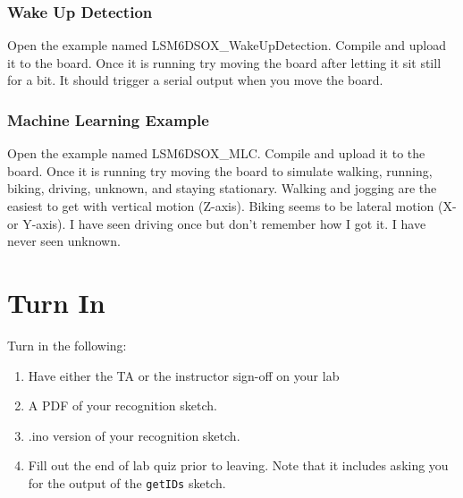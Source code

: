 \subsubsection{Wake Up Detection}
Open the example named LSM6DSOX\_WakeUpDetection. Compile and upload it to the board. Once it is 
running try moving the board after letting it sit still for a bit. It should trigger a serial 
output when you move the board.

\subsubsection{Machine Learning Example}
Open the example named LSM6DSOX\_MLC. Compile and upload it to the board. Once it is 
running try moving the board to simulate walking, running, biking, driving, unknown, and 
staying stationary. Walking and jogging are the easiest to get with vertical motion (Z-axis). 
Biking seems to be lateral motion (X- or Y-axis). I have seen driving once but don't remember 
how I got it. I have never seen unknown.



\section{Turn In}
Turn in the following:
\begin{enumerate}
    \item Have either the TA or the instructor sign-off on your lab
    \item A PDF of your recognition sketch.
    \item .ino version of your recognition sketch.
    \item Fill out the end of lab quiz prior to leaving. Note that it includes asking you 
            for the output of the \lstinline$getIDs$ sketch. 
\end{enumerate}

